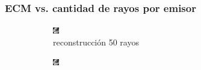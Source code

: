 \documentclass[11pt]{beamer}
\begin{document}
\begin{frame}
    \frametitle{ECM vs. cantidad de rayos por emisor}
    
    \begin{figure}[H]
        \centering
    
        \begin{subfigure}[h]{0.3\textwidth} 
            \includegraphics[width=\textwidth]{img/tomo_rayos_50.png}
            \caption{reconstrucción 50 rayos}
            \label{fig:reconstruccion 50 rayos}
        \end{subfigure}%
        \hfill
        \begin{subfigure}[h]{0.3\textwidth}
            \includegraphics[width=\textwidth]{img/tomo_rayos_100.png}

\end{subfigure}
\end{figure}
\end{frame}
\end{document}
